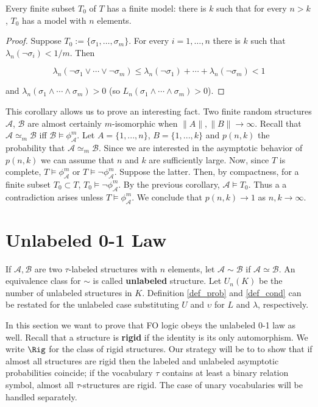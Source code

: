 \begin{cor} Every finite subset $T_0$ of $T$ has a finite model: there is $k$ such that for every $n > k$, $T_0$ has a model with $n$ elements. 
\begin{proof} Suppose $T_0 :=\{\sigma_1, \ldots, \sigma_m\}$. For every $i=1, \ldots, n$ there is $k$ such that $\lambda_n (\lnot \sigma_i) < 1/ m$. Then 

$$\lambda_n(\lnot \sigma_1 \lor \cdots \lor \lnot \sigma_m) \le \lambda_n(\lnot \sigma_1) + \cdots + \lambda_n(\lnot \sigma_m) <1 $$

and $\lambda_n(\sigma_1 \land \cdots \land \sigma_m) >0$ (so $L_n(\sigma_1 \land \cdots \land \sigma_m) >0$). 
\end{proof} 
\end{cor}

This corollary allows us to prove an interesting fact. 
Two finite random structures $\mathcal{A}$, $\mathcal{B}$ are almost certainly $m$-isomorphic when $\lVert A \rVert, \lVert B \rVert \to \infty $. 
Recall that $\mathcal{A} \simeq_m \mathcal{B}$ iff $\mathcal{B} \models \phi_{\mathcal{A}} ^m$. 
Let $A = \{1,...,n\}$, $B = \{1,...,k\}$ and $p(n,k)$ the probability that $\mathcal{A} \simeq_m \mathcal{B}$. 
Since we are interested in the asymptotic behavior of $p(n,k)$ we can assume that $n$ and $k$ are sufficiently large. 
Now, since $T$ is complete, $T \models \phi_{\mathcal{A}} ^m$  or $T \models \lnot \phi_{\mathcal{A}} ^m$. 
Suppose the latter. 
Then, by compactness, for a finite subset $T_0 \subset T$, $T_0 \models \lnot \phi_{\mathcal{A}} ^m$. 
By the previous corollary, $\mathcal{A} \models T_0$. 
Thus a a contradiction arises unless $T \models \phi_{\mathcal{A}} ^m$. 
We conclude that $p(n,k) \to 1$ as $n,k \to \infty$.

\section{Unlabeled 0-1 Law} 
If $\mathcal{A}, \mathcal{B}$ are two $\tau$-labeled structures with $n$ elements, let $\mathcal{A} \sim \mathcal{B}$ if $\mathcal{A} \simeq \mathcal{B}$. An equivalence class for $\sim$ is called \textbf{unlabeled} structure. 
Let $U_n(K)$ be the number of unlabeled structures in $K$. 
Definition \ref{def_prob} and \ref{def_cond} can be restated for the unlabeled case substituting $U$ and $\upsilon$ for $L$ and $\lambda$, respectively. 

In this section we want to prove that FO logic obeys the unlabeled 0-1 law as well. Recall that a structure is \textbf{rigid} if the identity is its only automorphism. 
We write $\Rig$ for the class of rigid structures.
Our strategy will be to to show that if almost all structures are rigid then the labeled and unlabeled asymptotic probabilities coincide; if the vocabulary $\tau$ contains at least a binary relation symbol, almost all $\tau$-structures are rigid. The case of unary vocabularies will be handled separately. 

